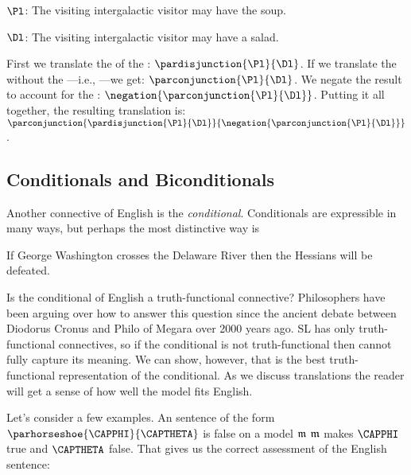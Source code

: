 \begin{description}[itemsep=0em]
	\item[Translation Key:] \hfill{} 
	\begin{description}[itemsep=0em]
		\item $\Pl$: The visiting intergalactic visitor may have the soup.
		\item $\Dl$: The visiting intergalactic visitor may have a salad.
	\end{description} 
\end{description}

\noindent{}First we translate the  of the : $\pardisjunction{\Pl}{\Dl}$.
If we translate the  without the ---i.e., ---we get: $\parconjunction{\Pl}{\Dl}$.
We negate the result to account for the : $\negation{\parconjunction{\Pl}{\Dl}}$.
Putting it all together, the resulting translation is: $\parconjunction{\pardisjunction{\Pl}{\Dl}}{\negation{\parconjunction{\Pl}{\Dl}}}$.

\subsection{Conditionals and Biconditionals}\label{Translating GSLConditionals}

Another connective of English is the \emph{conditional}.
Conditionals are expressible in many ways, but perhaps the most distinctive way is 

\begin{menumerate}
	\item If George Washington crosses the Delaware River then the Hessians will be defeated.
\end{menumerate}

\noindent{}Is the conditional of English a truth-functional connective?
Philosophers have been arguing over how to answer this question since the ancient debate between Diodorus Cronus and Philo of Megara over 2000 years ago.
SL has only truth-functional connectives, so if the conditional is not truth-functional then \mention{$\HORSESHOE$} cannot fully capture its meaning.
We can show, however, that \mention{$\HORSESHOE$} is the best truth-functional representation of the conditional.
As we discuss translations the reader will get a sense of how well the model fits English.

Let's consider a few examples.
An \GSL{} sentence of the form $\parhorseshoe{\CAPPHI}{\CAPTHETA}$ is false on a model $\mathfrak{m}$ \Iff $\mathfrak{m}$ makes $\CAPPHI$ true and $\CAPTHETA$ false.
That gives us the correct assessment of the English sentence:

